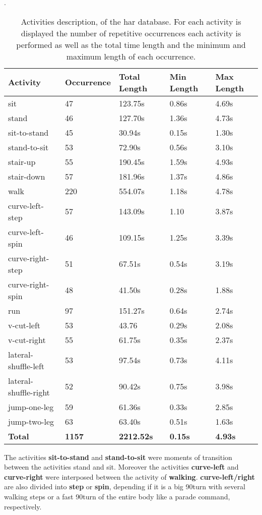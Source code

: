\begin{table}[ht]
	\caption[Activities description, of the \gls{har} database]{Activities description, of the \gls{har} database\cite{Liu2019}. For each activity is displayed the number of repetitive occurrences each activity is performed as well as the total time length and the minimum and maximum length of each occurrence.}.
	\label{tab:hui_actvs}
\centering
\begin{tabular}{lllll}
	\toprule
	\textbf{Activity} & 
	\textbf{Occurrence} &
	\textbf{Total Length} & 
	\textbf{Min Length} &
	\textbf{Max Length}\\
    \midrule
 sit & 47 & 123.75s & 0.86s & 4.69s\\
 stand & 46 & 127.70s & 1.36s & 4.73s \\
 sit-to-stand & 45 & 30.94s & 0.15s & 1.30s\\
 stand-to-sit & 53 & 72.90s & 0.56s & 3.10s\\
 stair-up & 55 & 190.45s & 1.59s & 4.93s\\
 stair-down & 57 & 181.96s & 1.37s & 4.86s\\
 walk & 220 & 554.07s & 1.18s & 4.78s\\
 curve-left-step & 57 & 143.09s & 1.10 & 3.87s\\
 curve-left-spin & 46 & 109.15s & 1.25s & 3.39s\\
 curve-right-step & 51 & 67.51s & 0.54s & 3.19s \\
 curve-right-spin & 48 & 41.50s & 0.28s & 1.88s \\
 run & 97 & 151.27s & 0.64s & 2.74s\\
 v-cut-left & 53 & 43.76 & 0.29s & 2.08s\\
 v-cut-right & 55 & 61.75s & 0.35s & 2.37s\\
 lateral-shuffle-left & 53 & 97.54s & 0.73s & 4.11s \\
 lateral-shuffle-right & 52 & 90.42s & 0.75s & 3.98s\\
 jump-one-leg & 59 & 61.36s & 0.33s & 2.85s \\
 jump-two-leg & 63 & 63.40s & 0.51s & 1.63s\\
 \hline
 \textbf{Total} & \textbf{1157} & \textbf{2212.52s} & \textbf{0.15s} & \textbf{4.93s}\\
\bottomrule
\end{tabular}
\end{table}

The activities \textbf{sit-to-stand} and \textbf{stand-to-sit} were moments of transition between the activities stand and sit. Moreover the activities \textbf{curve-left} and \textbf{curve-right} were interposed between the activity of \textbf{walking}. \textbf{curve-left/right} are also divided into \textbf{step} or \textbf{spin}, depending if it is a big 90\degree turn with several walking steps or a fast 90\degree turn of the entire body like a parade command, respectively.

